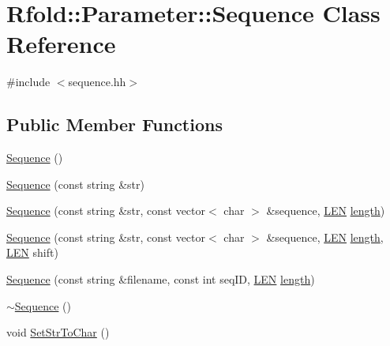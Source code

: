 \hypertarget{class_rfold_1_1_parameter_1_1_sequence}{\section{Rfold\+:\+:Parameter\+:\+:Sequence Class Reference}
\label{class_rfold_1_1_parameter_1_1_sequence}
}


{\ttfamily \#include $<$sequence.\+hh$>$}

\subsection*{Public Member Functions}
\begin{DoxyCompactItemize}
\item 
\hyperlink{class_rfold_1_1_parameter_1_1_sequence_ab2aad5252c57fc410a8bd122cb5a0f0e}{Sequence} ()
\item 
\hyperlink{class_rfold_1_1_parameter_1_1_sequence_a6abde50eed15e5bd3bf1a4888132be1d}{Sequence} (const string \&str)
\item 
\hyperlink{class_rfold_1_1_parameter_1_1_sequence_a9b7d40f144e63aeff7834c081661b238}{Sequence} (const string \&str, const vector$<$ char $>$ \&sequence, \hyperlink{energy__const_8hh_a05b49c662c073f89e86804f7856622a0}{L\+E\+N} \hyperlink{class_rfold_1_1_parameter_1_1_sequence_aa9e3bfb9862ce32ecc4ab2260e4dd40c}{length})
\item 
\hyperlink{class_rfold_1_1_parameter_1_1_sequence_a7505d8d474a76a8d57da433c38e4fb9d}{Sequence} (const string \&str, const vector$<$ char $>$ \&sequence, \hyperlink{energy__const_8hh_a05b49c662c073f89e86804f7856622a0}{L\+E\+N} \hyperlink{class_rfold_1_1_parameter_1_1_sequence_aa9e3bfb9862ce32ecc4ab2260e4dd40c}{length}, \hyperlink{energy__const_8hh_a05b49c662c073f89e86804f7856622a0}{L\+E\+N} shift)
\item 
\hyperlink{class_rfold_1_1_parameter_1_1_sequence_aa5160e467553cf7da27ead1c8ef1d950}{Sequence} (const string \&filename, const int seq\+I\+D, \hyperlink{energy__const_8hh_a05b49c662c073f89e86804f7856622a0}{L\+E\+N} \hyperlink{class_rfold_1_1_parameter_1_1_sequence_aa9e3bfb9862ce32ecc4ab2260e4dd40c}{length})
\item 
\hyperlink{class_rfold_1_1_parameter_1_1_sequence_a4904474a30a4685879ecc795b1f74d61}{$\sim$\+Sequence} ()
\item 
void \hyperlink{class_rfold_1_1_parameter_1_1_sequence_ad52082fb6045b92289ba7ff0eeaa405f}{Set\+Str\+To\+Char} ()
\item 

\end{DoxyCompactItemize}
